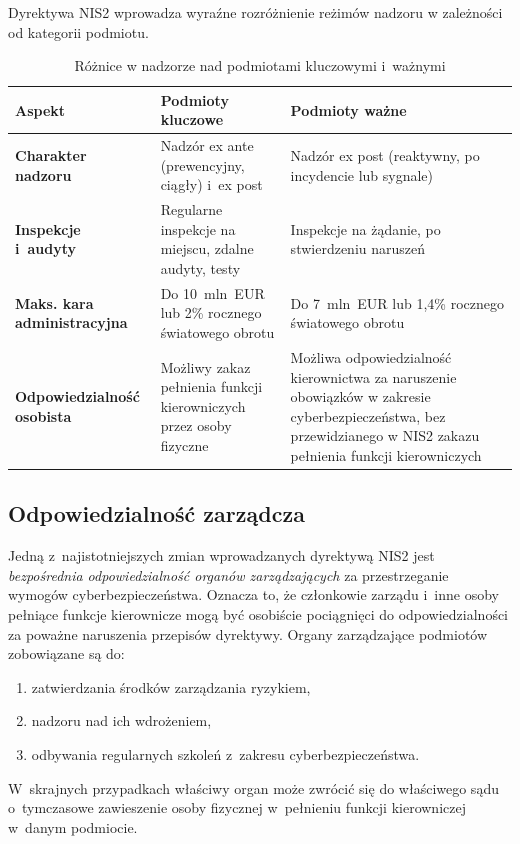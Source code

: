 Dyrektywa NIS2 wprowadza wyraźne rozróżnienie reżimów nadzoru w zależności
od kategorii podmiotu.

\begin{table}[H]
\centering
\caption{Różnice w nadzorze nad podmiotami kluczowymi i~ważnymi}
\label{tab:nis2_nadzor}
\begin{tabular}{>{\bfseries}p{4.5cm} p{4.5cm} p{4.5cm}}
\hline
Aspekt & Podmioty kluczowe & Podmioty ważne \\
\hline
Charakter nadzoru
  & Nadzór ex ante (prewencyjny, ciągły) i~ex post
  & Nadzór ex post (reaktywny, po incydencie lub sygnale) \\[4pt]
Inspekcje i~audyty
  & Regularne inspekcje na miejscu, zdalne audyty, testy
  & Inspekcje na żądanie, po stwierdzeniu naruszeń \\[4pt]
Maks. kara administracyjna
  & Do 10~mln~EUR lub 2\% rocznego światowego obrotu
  & Do 7~mln~EUR lub 1,4\% rocznego światowego obrotu \\[4pt]
Odpowiedzialność osobista
  & Możliwy zakaz pełnienia funkcji kierowniczych przez osoby fizyczne
  & Możliwa odpowiedzialność kierownictwa za naruszenie obowiązków w zakresie cyberbezpieczeństwa, bez przewidzianego w NIS2 zakazu pełnienia funkcji kierowniczych \\
\hline
\end{tabular}
\end{table}

\subsection{Odpowiedzialność zarządcza}

Jedną z~najistotniejszych zmian wprowadzanych dyrektywą NIS2 jest \textit{bezpośrednia odpowiedzialność organów zarządzających} za przestrzeganie wymogów cyberbezpieczeństwa. Oznacza to, że członkowie zarządu i~inne osoby pełniące funkcje kierownicze mogą być osobiście pociągnięci do odpowiedzialności
za poważne naruszenia przepisów dyrektywy. Organy zarządzające podmiotów zobowiązane są do: 
\begin{enumerate}[label=(\roman*)]
  \item zatwierdzania środków zarządzania ryzykiem,
  \item nadzoru nad ich wdrożeniem,
  \item odbywania regularnych szkoleń z~zakresu cyberbezpieczeństwa. 
\end{enumerate}

W~skrajnych przypadkach właściwy organ może zwrócić się do właściwego sądu o~tymczasowe zawieszenie osoby fizycznej
w~pełnieniu funkcji kierowniczej w~danym podmiocie.


